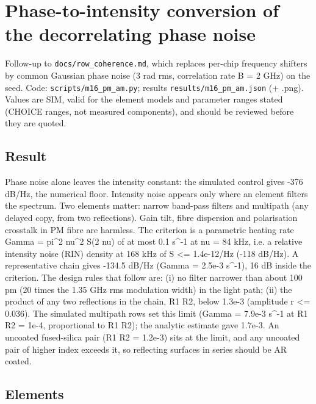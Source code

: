 \hypertarget{phase-to-intensity-conversion-of-the-decorrelating-phase-noise}{%
\chapter{Phase-to-intensity conversion of the decorrelating phase
noise}\label{pm_am-phase-to-intensity-conversion-of-the-decorrelating-phase-noise}}

Follow-up to \texttt{docs/row\_coherence.md}, which replaces per-chip
frequency shifters by common Gaussian phase noise (3 rad rms,
correlation rate B = 2 GHz) on the seed. Code:
\texttt{scripts/m16\_pm\_am.py}; results
\texttt{results/m16\_pm\_am.json} (+ .png). Values are SIM, valid for
the element models and parameter ranges stated (CHOICE ranges, not
measured components), and should be reviewed before they are quoted.

\hypertarget{1-result}{%
\section{Result}\label{pm_am-1-result}}

Phase noise alone leaves the intensity constant: the simulated control
gives -376 dB/Hz, the numerical floor. Intensity noise appears only
where an element filters the spectrum. Two elements matter: narrow
band-pass filters and multipath (any delayed copy, from two
reflections). Gain tilt, fibre dispersion and polarisation crosstalk in
PM fibre are harmless. The criterion is a parametric heating rate Gamma
= pi\^{}2 nu\^{}2 S(2 nu) of at most 0.1 s\^{}-1 at nu = 84 kHz, i.e. a
relative intensity noise (RIN) density at 168 kHz of S \textless=
1.4e-12/Hz (-118 dB/Hz). A representative chain gives -134.5 dB/Hz
(Gamma = 2.5e-3 s\^{}-1), 16 dB inside the criterion. The design rules
that follow are: (i) no filter narrower than about 100 pm (20 times the
1.35 GHz rms modulation width) in the light path; (ii) the product of
any two reflections in the chain, R1 R2, below 1.3e-3 (amplitude r
\textless= 0.036). The simulated multipath rows set this limit (Gamma =
7.9e-3 s\^{}-1 at R1 R2 = 1e-4, proportional to R1 R2); the analytic
estimate gave 1.7e-3. An uncoated fused-silica pair (R1 R2 = 1.2e-3)
sits at the limit, and any uncoated pair of higher index exceeds it, so
reflecting surfaces in series should be AR coated.

\hypertarget{2-elements}{%
\section{Elements}\label{pm_am-2-elements}}

